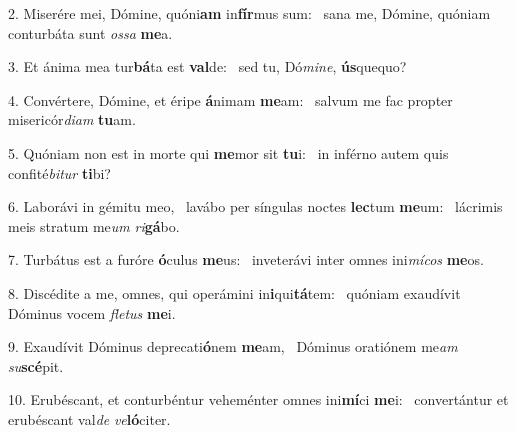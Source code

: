 2. Miserére mei, Dómine, quóni\textbf{am} in\textbf{fír}mus sum: \ast\  sana me, Dómine, quóniam conturbáta sunt \textit{os}\textit{sa} \textbf{me}a.\

3. Et ánima mea tur\textbf{bá}ta est \textbf{val}de: \ast\  sed tu, Dó\textit{mi}\textit{ne}, \textbf{ús}quequo?\

4. Convértere, Dómine, et éripe \textbf{á}nimam \textbf{me}am: \ast\  salvum me fac propter misericór\textit{di}\textit{am} \textbf{tu}am.\

5. Quóniam non est in morte qui \textbf{me}mor sit \textbf{tu}i: \ast\  in inférno autem quis confité\textit{bi}\textit{tur} \textbf{ti}bi?\

6. Laborávi in gémitu meo, \dag\  lavábo per síngulas noctes \textbf{lec}tum \textbf{me}um: \ast\  lácrimis meis stratum me\textit{um} \textit{ri}\textbf{gá}bo.\

7. Turbátus est a furóre \textbf{ó}culus \textbf{me}us: \ast\  inveterávi inter omnes ini\textit{mí}\textit{cos} \textbf{me}os.\

8. Discédite a me, omnes, qui operámini in\textbf{i}qui\textbf{tá}tem: \ast\  quóniam exaudívit Dóminus vocem \textit{fle}\textit{tus} \textbf{me}i.\

9. Exaudívit Dóminus deprecati\textbf{ó}nem \textbf{me}am, \ast\  Dóminus oratiónem me\textit{am} \textit{su}\textbf{scé}pit.\

10. Erubéscant, et conturbéntur veheménter omnes ini\textbf{mí}ci \textbf{me}i: \ast\  convertántur et erubéscant val\textit{de} \textit{ve}\textbf{ló}citer.\

